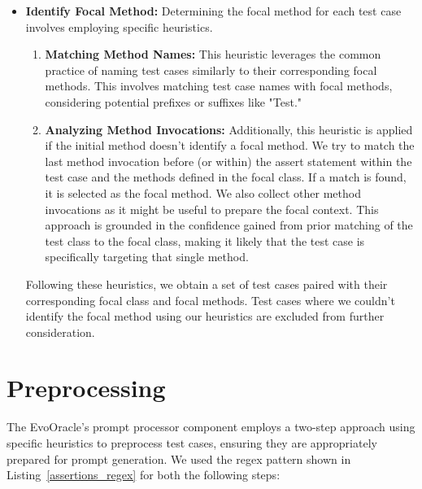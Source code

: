 \begin{itemize}
  \item \textbf{Identify Focal Method:} Determining the focal method for each test case involves employing specific heuristics. 
  \begin{enumerate}
      \item \textbf{Matching Method Names:} This heuristic leverages the common practice of naming test cases similarly to their corresponding focal methods. This involves matching test case names with focal methods, considering potential prefixes or suffixes like "Test."
      \item \textbf{Analyzing Method Invocations:} Additionally, this heuristic is applied if the initial method doesn't identify a focal method. We try to match the last method invocation before (or within) the assert statement within the test case and the methods defined in the focal class. If a match is found, it is selected as the focal method. We also collect other method invocations as it might be useful to prepare the focal context. This approach is grounded in the confidence gained from prior matching of the test class to the focal class, making it likely that the test case is specifically targeting that single method.
  \end{enumerate}

  Following these heuristics, we obtain a set of test cases paired with their corresponding focal class and focal methods. Test cases where we couldn't identify the focal method using our heuristics are excluded from further consideration.
  
\end{itemize}

\section{Preprocessing}
\label{sec:preprocessing}
\vspace{0.2 cm}

The EvoOracle's prompt processor component employs a two-step approach using specific heuristics to preprocess test cases, ensuring they are appropriately prepared for prompt generation. We used the regex pattern shown in Listing~\ref{assertions_regex} for both the following steps:


